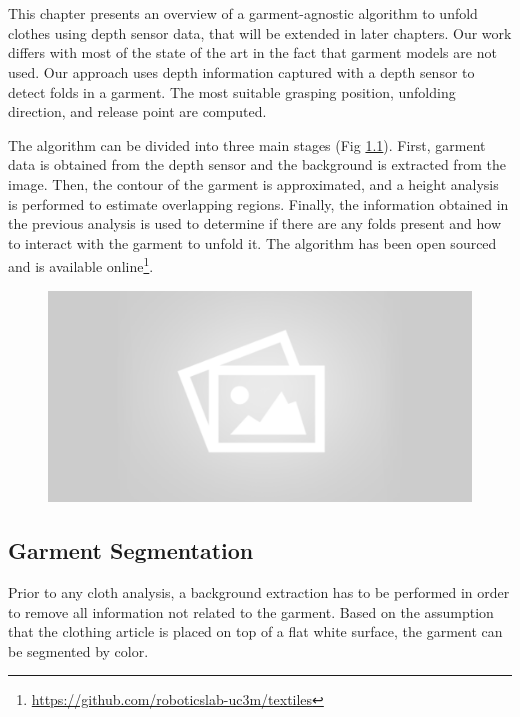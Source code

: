 \chapter{\MyTitle}
\label{architecture}

This chapter presents an overview of a garment-agnostic algorithm to unfold clothes using depth sensor data, that will be extended in later chapters. Our work differs with most of the state of the art in the fact that garment models are not used. Our approach uses depth information captured with a depth sensor to detect folds in a garment. The most suitable grasping position, unfolding direction, and release point are computed.

The algorithm can be divided into three main stages (Fig \ref{fig:pipeline_block_diagram}). First, garment data is obtained from the depth sensor and the background is extracted from the image. Then, the contour of the garment is approximated, and a height analysis is performed to estimate overlapping regions. Finally, the information obtained in the previous analysis is used to determine if there are any folds present and how to interact with the garment to unfold it. The algorithm has been open sourced and is available online\footnote{\url{https://github.com/roboticslab-uc3m/textiles}}.

\begin{figure}[thpb]
    \centering
    \includegraphics[width=0.8
    \textwidth]{figures/placeholder2.png}
    \caption{}
    \label{fig:pipeline_block_diagram}
\end{figure}

\section{Garment Segmentation}
Prior to any cloth analysis, a background extraction has to be performed in order to remove all information not related to the garment.
Based on the assumption that the clothing article is placed on top of a flat white surface, the garment can be segmented by color.

